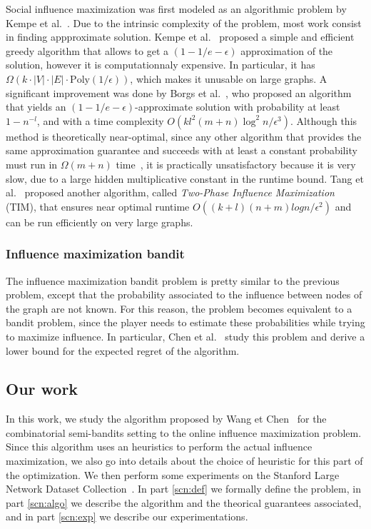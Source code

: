 \documentclass[a4paper,12pt]{article}
\begin{document}
Social influence maximization was first modeled as an algorithmic problem by Kempe et al.~\cite{kempe2003maximizing}. Due to the intrinsic complexity of the problem, most work consist in finding appproximate solution. Kempe et al.~\cite{kempe2003maximizing} proposed a simple and efficient greedy algorithm that allows to get a $(1-1/e-\epsilon)$ approximation of the solution, however it is computationnaly expensive. In particular, it has $\Omega(k\cdot|V|\cdot|E|\cdot\text{Poly}(1/\epsilon))$, which makes it unusable on large graphs. A significant improvement was done by Borgs et al.~\cite{borgs2014maximizing}, who proposed an algorithm that yields an $(1-1/e-\epsilon)$-approximate solution with probability at least $1-n^{-l}$, and with a time complexity $O(kl^2(m+n)\log^2 n / \epsilon^3)$. Although this method is theoretically near-optimal, since any other algorithm that provides the same approximation guarantee and succeeds with at least a constant probability must run in $\Omega(m + n)$ time~\cite{borgs2014maximizing}, it is practically unsatisfactory because it is very slow, due to a large hidden multiplicative constant in the runtime bound. Tang et al.~\cite{tang2014influence} proposed another algorithm, called \emph{Two-Phase Influence Maximization} (TIM), that ensures near optimal runtime $O((k + l)(n + m) log n/\epsilon^2)$ and can be run efficiently on very large graphs.

\subsubsection{Influence maximization bandit}

The influence maximization bandit problem is pretty similar to the previous problem, except that the probability associated to the influence between nodes of the graph are not known. For this reason, the problem becomes equivalent to a bandit problem, since the player needs to estimate these probabilities while trying to maximize influence. In particular, Chen et al.~\cite{chen2016combinatorial} study this problem and derive a lower bound for the expected regret of the algorithm.

\subsection{Our work}

In this work, we study the algorithm proposed by Wang et Chen~\cite{wang2017improving} for the combinatorial semi-bandits setting to the online influence maximization problem. Since this algorithm uses an heuristics to perform the actual influence maximization, we also go into details about the choice of heuristic for this part of the optimization. We then perform some experiments on the Stanford Large Network Dataset Collection~\cite{leskovec2015snap}. In part \ref{scn:def} we formally define the problem, in part \ref{scn:algo} we describe the algorithm and the theorical guarantees associated, and in part \ref{scn:exp} we describe our experimentations.
\end{document}
